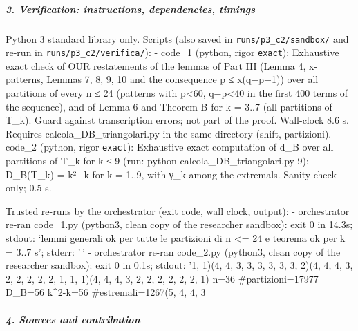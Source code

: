\documentclass[11pt,a4paper]{article}
\begin{document}
\subparagraph{3. Verification: instructions, dependencies,
timings}\label{verification-instructions-dependencies-timings}

Python 3 standard library only. Scripts (also saved in
\texttt{runs/p3\_c2/sandbox/} and re-run in
\texttt{runs/p3\_c2/verifica/}): - code\_1 (python, rigor
\texttt{exact}): Exhaustive exact check of OUR restatements of the
lemmas of Part III (Lemma 4, x-patterns, Lemmas 7, 8, 9, 10 and the
consequence p ≤ x(q−p−1)) over all partitions of every n ≤ 24 (patterns
with p\textless60, q−p\textless40 in the first 400 terms of the
sequence), and of Lemma 6 and Theorem B for k = 3..7 (all partitions of
T\_k). Guard against transcription errors; not part of the proof.
Wall-clock 8.6 s. Requires calcola\_DB\_triangolari.py in the same
directory (shift, partizioni). - code\_2 (python, rigor \texttt{exact}):
Exhaustive exact computation of d\_B over all partitions of T\_k for k ≤
9 (run: python calcola\_DB\_triangolari.py 9): D\_B(T\_k) = k²−k for k =
1..9, with γ\_k among the extremals. Sanity check only; 0.5 s.

Trusted re-runs by the orchestrator (exit code, wall clock, output): -
orchestrator re-ran code\_1.py (python3, clean copy of the researcher
sandbox): exit 0 in 14.3s; stdout: `lemmi generali ok per tutte le
partizioni di n \textless= 24 e teorema ok per k =
3..7 s'; stderr: '\,' - orchestrator re-ran code\_2.py
(python3, clean copy of the researcher sandbox): exit 0 in 0.1s; stdout:
'1, 1)\n    (4, 4, 3, 3, 3, 3, 3, 3, 2)\n    (4, 4, 4, 3, 2, 2, 2, 2, 2,
1, 1, 1)\n    (4, 4, 4, 3, 2, 2, 2, 2, 2, 2, 1) n=36
\#partizioni=17977 D\_B=56 k\^{}2-k=56 \#estremali=1267\n    (5, 4, 4, 3

\subparagraph{4. Sources and
contribution}\label{sources-and-contribution}
\end{document}
